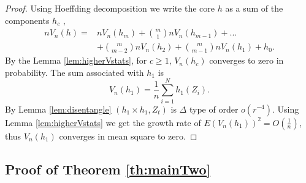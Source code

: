 \documentclass{article} %
\newtheorem{Theorem}{Theorem}
\newcommand{\ev}{E}
\begin{document}
\begin{proof}
Using  Hoeffding decomposition we  write the core  $h$ as a sum of the components $h_c$ ,
\begin{align*}
  n V_n(h) =& n V_n(h_m) + \binom m 1 n V_n(h_{m-1}) + ... \\ 
  &+ \binom {m} {m-2} n V_n(h_{2}) + \binom {m} {m-1} n V_n(h_{1})+h_0.
\end{align*}
By the  Lemma \ref{lem:higherVstats}, for $c \geq 1$, $V_n(h_{c})$  converges to zero in probability. The sum associated with $h_1$ is
\[
V_n(h_1) = \frac 1 n \sum_{i=1}^{N} h_1(Z_i).
\]
By Lemma \ref{lem:disentangle}  $(h_1 \times h_1,Z_t)$ is $\varDelta$ type of order  $o(r^{-4})$. Using Lemma \ref{lem:higherVstats} we get the growth rate of 
$ \ev (V_n(h_1))^2= O(\frac 1 n)$, thus $V_n(h_1)$ converges in mean square to zero.
\end{proof}


\subsection{Proof of Theorem \ref{th:mainTwo}}
\label{sec:prMainTwo}


\end{document}
